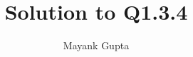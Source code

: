 \documentclass[journal,12pt,twocolumn]{IEEEtran}
\theoremstyle{remark}
\begin{document}
%




\vspace{3cm}

\title{
	Solution to Q1.3.4
}
\author{ Mayank Gupta%
	
}	


%
%
%

% 
%
\end{document}
